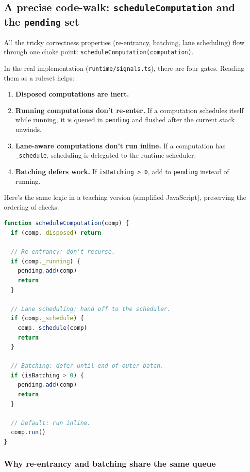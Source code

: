 \subsection{A precise code-walk: \texttt{scheduleComputation} and the \texttt{pending} set}

All the tricky correctness properties (re-entrancy, batching, lane scheduling) flow through one choke point:
	\texttt{scheduleComputation(computation)}.

In the real implementation (\texttt{runtime/signals.ts}), there are four gates.
Reading them as a ruleset helps:

\begin{enumerate}
  \item \textbf{Disposed computations are inert.}
  \item \textbf{Running computations don't re-enter.} If a computation schedules itself while running, it is queued in \texttt{pending} and flushed after the current stack unwinds.
  \item \textbf{Lane-aware computations don't run inline.} If a computation has \texttt{\_schedule}, scheduling is delegated to the runtime scheduler.
  \item \textbf{Batching defers work.} If \texttt{isBatching > 0}, add to \texttt{pending} instead of running.
\end{enumerate}

Here's the same logic in a teaching version (simplified JavaScript), preserving the ordering of checks:

\begin{lstlisting}[language=JavaScript]
function scheduleComputation(comp) {
  if (comp._disposed) return

  // Re-entrancy: don't recurse.
  if (comp._running) {
    pending.add(comp)
    return
  }

  // Lane scheduling: hand off to the scheduler.
  if (comp._schedule) {
    comp._schedule(comp)
    return
  }

  // Batching: defer until end of outer batch.
  if (isBatching > 0) {
    pending.add(comp)
    return
  }

  // Default: run inline.
  comp.run()
}
\end{lstlisting}

\subsubsection{Why re-entrancy and batching share the same queue}

